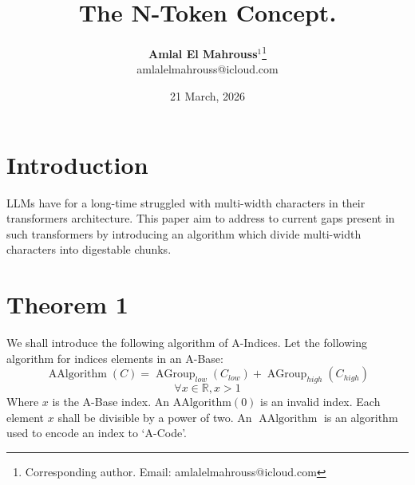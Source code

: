 \documentclass[10pt, twocolumn]{article}
\title{%
  \vspace{-1.5em}%
  \large\textbf{The N-Token Concept.}%
}
\author{%
  \textbf{Amlal El Mahrouss}$^{1}$\thanks{Corresponding author. Email: amlalelmahrouss@icloud.com}
  \\amlalelmahrouss@icloud.com\\[0.4em]
}
\date{%
  \small 21 March, 2026
}
\theoremstyle{plain}
\theoremstyle{definition}
\theoremstyle{remark}
\begin{document}

\twocolumn[{%
  \maketitle
  \vspace{-0.5em}
  \rule{\linewidth}{0.4pt}
  \begin{center}
  \begin{minipage}{0.92\linewidth}
    \small
    \textbf{Abstract.}\enspace
    This development paper presents an algorithm which expresses characters, 'A', 'B', 'Z' as single tokens. Each character has an index chosen by two parties, e.g: A=428, B=422.

    \medskip
    \textbf{Keywords:}\enspace
    Computer Science; Software Engineering;
  \end{minipage}
  \end{center}
  \vspace{0.8em}
  \rule{\linewidth}{0.4pt}
  \vspace{1em}
}]

\section{Introduction}
\label{sec:acode-introduction}

LLMs have for a long-time struggled with multi-width characters in their transformers architecture. This paper aim to address to current gaps present in such transformers by introducing an algorithm which divide multi-width characters into digestable chunks. 

\section{Theorem 1}
\label{sec:acode-theorem01}

We shall introduce the following algorithm of A-Indices.
Let the following algorithm for indices elements in an A-Base:
\begin{equation}
    \operatorname{AAlgorithm}(C) = \operatorname{AGroup}_{low}(C_{low})+\operatorname{AGroup}_{high}(C_{high})
\end{equation}
\begin{equation}
    \forall x \in \mathbb{R}, x > 1
\end{equation}
Where $x$ is the A-Base index. An $\operatorname{AAlgorithm(0)}$ is an invalid index. Each element $x$ shall be divisible by a power of two. An $\operatorname{AAlgorithm}$ is an algorithm used to encode an index to `A-Code'.
\end{document}
